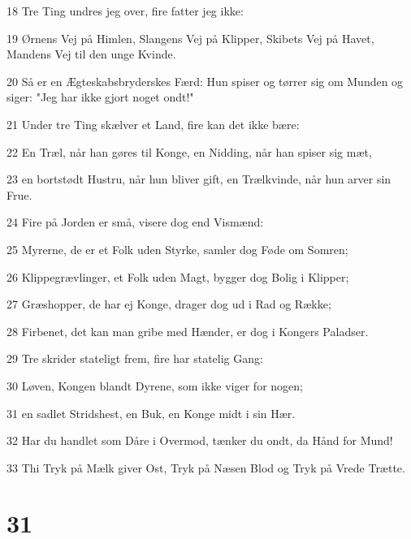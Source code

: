 \par 18 Tre Ting undres jeg over, fire fatter jeg ikke:
\par 19 Ørnens Vej på Himlen, Slangens Vej på Klipper, Skibets Vej på Havet, Mandens Vej til den unge Kvinde.
\par 20 Så er en Ægteskabsbryderskes Færd: Hun spiser og tørrer sig om Munden og siger: "Jeg har ikke gjort noget ondt!"
\par 21 Under tre Ting skælver et Land, fire kan det ikke bære:
\par 22 En Træl, når han gøres til Konge, en Nidding, når han spiser sig mæt,
\par 23 en bortstødt Hustru, når hun bliver gift, en Trælkvinde, når hun arver sin Frue.
\par 24 Fire på Jorden er små, visere dog end Vismænd:
\par 25 Myrerne, de er et Folk uden Styrke, samler dog Føde om Somren;
\par 26 Klippegrævlinger, et Folk uden Magt, bygger dog Bolig i Klipper;
\par 27 Græshopper, de har ej Konge, drager dog ud i Rad og Række;
\par 28 Firbenet, det kan man gribe med Hænder, er dog i Kongers Paladser.
\par 29 Tre skrider stateligt frem, fire har statelig Gang:
\par 30 Løven, Kongen blandt Dyrene, som ikke viger for nogen;
\par 31 en sadlet Stridshest, en Buk, en Konge midt i sin Hær.
\par 32 Har du handlet som Dåre i Overmod, tænker du ondt, da Hånd for Mund!
\par 33 Thi Tryk på Mælk giver Ost, Tryk på Næsen Blod og Tryk på Vrede Trætte.

\chapter{31}

